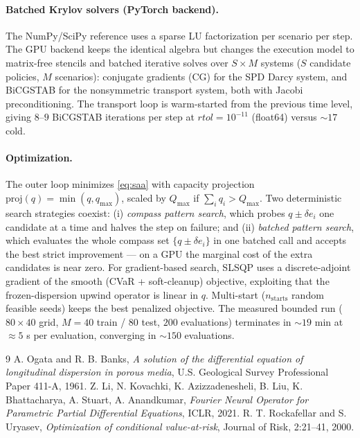 \documentclass[10pt]{article}
\begin{document}
\paragraph{Batched Krylov solvers (PyTorch backend).}
The NumPy/SciPy reference uses a sparse LU factorization per scenario per step.
The GPU backend keeps the identical algebra but changes the execution model to
matrix-free stencils and batched iterative solves over $S\times M$ systems
($S$ candidate policies, $M$ scenarios): conjugate gradients (CG) for the SPD
Darcy system, and BiCGSTAB for the nonsymmetric transport system, both with
Jacobi preconditioning. The transport loop is warm-started from the previous
time level, giving $8$--$9$ BiCGSTAB iterations per step at $rtol=10^{-11}$
(float64) versus $\sim\!17$ cold.

\paragraph{Optimization.}
The outer loop minimizes \eqref{eq:saa} with capacity projection
$\mathrm{proj}(q)=\min(q,q_{\max})$, scaled by $Q_{\max}$ if
$\sum_i q_i>Q_{\max}$. Two deterministic search strategies coexist:
(i) \emph{compass pattern search}, which probes $q\pm\delta e_i$ one candidate
at a time and halves the step on failure; and (ii) \emph{batched pattern
search}, which evaluates the whole compass set
$\{q\pm\delta e_i\}$ in one batched call and accepts the best strict
improvement --- on a GPU the marginal cost of the extra candidates is near zero.
For gradient-based search, SLSQP uses a discrete-adjoint gradient of the
smooth (CVaR + soft-cleanup) objective, exploiting that the frozen-dispersion
upwind operator is linear in $q$. Multi-start ($n_{\mathrm{starts}}$ random
feasible seeds) keeps the best penalized objective. The measured bounded run
($80\times40$ grid, $M=40$ train / $80$ test, $200$ evaluations) terminates in
$\sim\!19$ min at $\approx5$ s per evaluation, converging in $\sim\!150$
evaluations.

\begin{thebibliography}{9}
A. Ogata and R. B. Banks, \textit{A solution of the differential equation of
longitudinal dispersion in porous media}, U.S. Geological Survey Professional
Paper 411-A, 1961.
Z. Li, N. Kovachki, K. Azizzadenesheli, B. Liu, K. Bhattacharya, A. Stuart,
A. Anandkumar, \textit{Fourier Neural Operator for Parametric Partial
Differential Equations}, ICLR, 2021.
R. T. Rockafellar and S. Uryasev, \textit{Optimization of conditional
value-at-risk}, Journal of Risk, 2:21--41, 2000.
\end{thebibliography}
\end{document}
